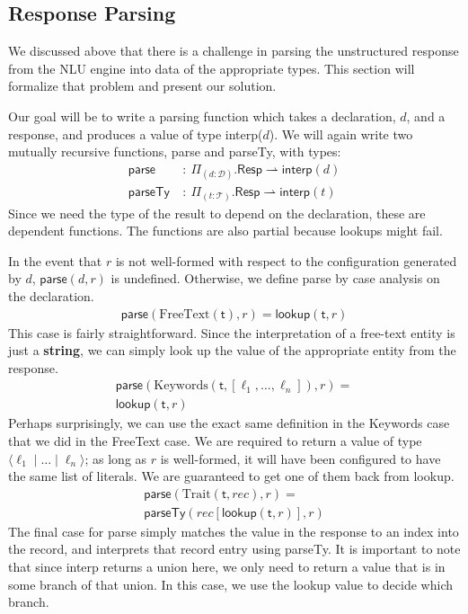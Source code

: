 \documentclass[twocolumn]{article}
\newcommand{\fcy}[1]{\mathcal{#1}}
\newcommand{\etag}[1]{\textsf{#1}}
\newcommand{\ff}[1]{\textsf{#1}}
\begin{document}
\subsection{Response Parsing}
We discussed above that there is a challenge in parsing the unstructured
response from the NLU engine into data of the appropriate types. This section
will formalize that problem and present our solution.

Our goal will be to write a parsing function which takes a declaration, $d$, and
a response, and produces a value of type \ff{interp}($d$). We will again write
two mutually recursive functions, \ff{parse} and \ff{parseTy}, with types:
\begin{align*}
\ff{parse}\ &:\ \Pi_{(d : \fcy{D})}. \textsf{Resp} \rightharpoonup \ff{interp}(d) \\
\ff{parseTy}\ &:\ \Pi_{(t : \fcy{T})}. \textsf{Resp} \rightharpoonup \ff{interp}(t)
\end{align*}
Since we need the type of the result to depend on the declaration, these are
dependent functions. The functions are also partial because lookups might fail.

In the event that $r$ is not well-formed with respect to the configuration
generated by $d$, $\ff{parse}(d, r)$ is undefined. Otherwise, we define
\ff{parse} by case analysis on the declaration.
\begin{align*}
  \ff{parse}(\text{FreeText}(\etag{t}), r) = \ff{lookup}(\etag{t}, r)
\end{align*}
This case is fairly straightforward. Since the interpretation of a free-text
entity is just a {\bf string}, we can simply look up the value of the
appropriate entity from the response.
\begin{align*}
  \ff{parse}(\text{Keywords}(\etag{t}, [\ell_1, \dots, \ell_n]), r) =\\
  \ff{lookup}(\etag{t}, r)
\end{align*}
Perhaps surprisingly, we can use the exact same definition in the Keywords case
that we did in the FreeText case. We are required to return a value of type
$\langle {\ell_1 \mid \dots \mid \ell_n} \rangle$; as long as $r$ is
well-formed, it will have been configured to have the same list of literals. We
are guaranteed to get one of them back from \ff{lookup}.
\begin{align*}
  \ff{parse}(\text{Trait}(\etag{t}, rec), r) = \\
  \ff{parseTy}(rec[\ff{lookup}(\etag{t}, r)], r)
\end{align*}
The final case for \ff{parse} simply matches the value in the response to an
index into the record, and interprets that record entry using \ff{parseTy}. It
is important to note that since \ff{interp} returns a union here, we only need
to return a value that is in some branch of that union. In this case, we use the
\ff{lookup} value to decide which branch.
\end{document}
